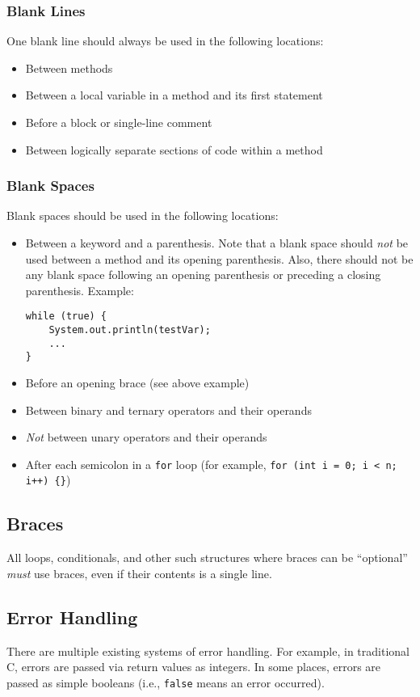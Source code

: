 \documentclass[12pt,letter]{memoir} %
\begin{document}
			\subsubsection{Blank Lines}
				One blank line should always be used in the following locations:
				\begin{itemize}
					\item Between methods
					\item Between a local variable in a method and its first
						statement
					\item Before a block or single-line comment
					\item Between logically separate sections of code within a
						method
				\end{itemize}
			\subsubsection{Blank Spaces}
				Blank spaces should be used in the following locations:
				\begin{itemize}
					\item Between a keyword and a parenthesis. Note that a blank
						space should \emph{not} be used between a method and its
						opening parenthesis. Also, there should not be any blank
						space following an opening parenthesis or preceding a
						closing parenthesis. Example:
						\begin{lstlisting}
while (true) {
    System.out.println(testVar);
	...
}
						\end{lstlisting}
					\item Before an opening brace (see above example)
					\item Between binary and ternary operators and their
						operands
					\item \emph{Not} between unary operators and their operands
					\item After each semicolon in a \texttt{for} loop (for
						example, \texttt{for (int i = 0; i < n; i++) \{\}})
				\end{itemize}
		\subsection{Braces}
			All loops, conditionals, and other such structures where braces can
			be ``optional'' \emph{must} use braces, even if their contents is a
			single line.
		\subsection{Error Handling}
			There are multiple existing systems of error handling. For example,
			in traditional C, errors are passed via return values as integers.
			In some places, errors are passed as simple booleans (i.e.,
			\texttt{false} means an error occurred).
			
\end{document}
